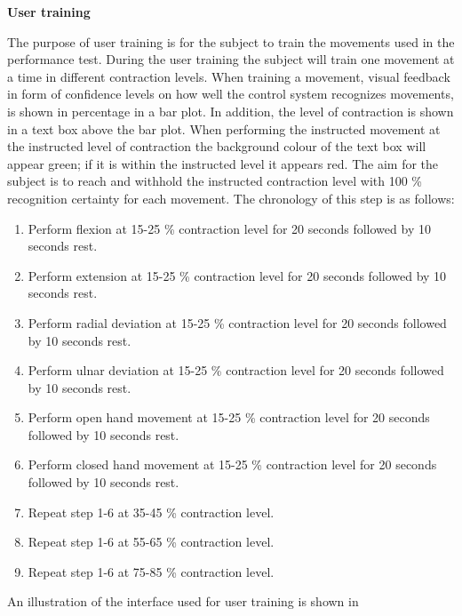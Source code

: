 \textbf{User training} %

The purpose of user training is for the subject to train the movements used in the performance test. During the user training the subject will train one movement at a time in different contraction levels. When training a movement, visual feedback in form of confidence levels on how well the control system recognizes movements, is shown in percentage in a bar plot. In addition, the level of contraction is shown in a text box above the bar plot. When performing the instructed movement at the instructed level of contraction the background colour of the text box will appear green; if it is within the instructed level it appears red. The aim for the subject is to reach and withhold the instructed contraction level with 100 \% recognition certainty for each movement. The chronology of this step is as follows:

\begin{enumerate}
	\item Perform flexion at 15-25 \% contraction level for 20 seconds followed by 10 seconds rest.
	\item Perform extension at 15-25 \% contraction level for 20 seconds followed by 10 seconds rest.
	\item Perform radial deviation at 15-25 \% contraction level for 20 seconds followed by 10 seconds rest.
	\item Perform ulnar deviation at 15-25 \% contraction level for 20 seconds followed by 10 seconds rest.
	\item Perform open hand movement at 15-25 \% contraction level for 20 seconds followed by 10 seconds rest.
	\item Perform closed hand movement at 15-25 \% contraction level for 20 seconds followed by 10 seconds rest.
	\item Repeat step 1-6 at 35-45 \% contraction level.
	\item Repeat step 1-6 at 55-65 \% contraction level.
	\item Repeat step 1-6 at 75-85 \% contraction level.
\end{enumerate} 

An illustration of the interface used for user training is shown in 

